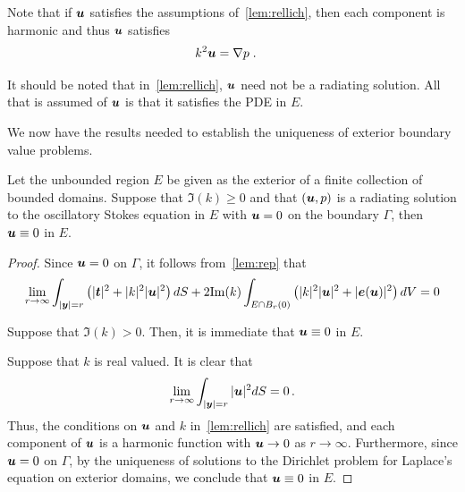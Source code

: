 \begin{remark} \label{rmk:harmu}
  Note that if ${\boldsymbol u}$ satisfies the assumptions
  of~\cref{lem:rellich}, then each component is harmonic
  and thus ${\boldsymbol u}$ satisfies
\begin{align}
k^2 {\boldsymbol u} &= \nabla p \label{eq:massconsred} \; .
\end{align}
\end{remark}

\begin{remark}
  It should be noted that in~\cref{lem:rellich}, ${\boldsymbol u}$ need
  not be a radiating solution. All that is assumed of ${\boldsymbol u}$
  is that it satisfies the PDE in $E$.
\end{remark}

We now have the results needed to establish the
uniqueness of exterior boundary value problems.

\begin{thrm}
  \label{thrm:unique_dir_ext}
  Let the unbounded region $E$ be given as the exterior
  of a finite collection of bounded domains.
  Suppose that $\Im(k)\geq 0$ and 
  that $({\boldsymbol u},p)$ is a radiating solution to the oscillatory Stokes
  equation in $E$ with ${\boldsymbol u} =0$ on the boundary $\Gamma$, then
  ${\boldsymbol u} \equiv 0$ in $E$.
\end{thrm}

\begin{proof}
Since ${\boldsymbol u} = 0$ on $\Gamma$, it follows from~\cref{lem:rep} that
\begin{equation}
\lim_{r\to\infty}
\int_{|{\boldsymbol y}|=r} \left( |{\boldsymbol t}|^2 + |k|^2 |{\boldsymbol u}|^2 \right) dS +
2 {\textrm{\textup{Im}}}(k) \int_{E \cap B_{r}(0)} \left(|k|^2 |{\boldsymbol u}|^2 + |{\boldsymbol e}({\boldsymbol u})|^2 \right)
dV = 0 \nonumber
\end{equation}

Suppose that $\Im(k) > 0$. Then, it is immediate that
${\boldsymbol u} \equiv 0$ in $E$.

Suppose that $k$ is real valued. It is clear that
\begin{equation}
\lim_{r\to\infty} \int_{|{\boldsymbol y}|=r} |{\boldsymbol u}|^2 dS = 0 \, . \nonumber
\end{equation}
Thus, the conditions on ${\boldsymbol u}$ and $k$ in~\cref{lem:rellich}
are satisfied, and each component of ${\boldsymbol u}$ is a harmonic function
with ${\boldsymbol u} \to 0$ as $r \to \infty$. Furthermore, since ${\boldsymbol u}=0$ on
$\Gamma$, by the uniqueness of solutions to the
Dirichlet problem for Laplace's equation
on exterior domains, we conclude that ${\boldsymbol u} \equiv 0$
in $E$.
\end{proof}

